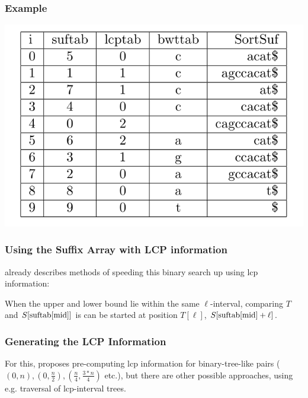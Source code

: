 \documentclass[compress,handout]{beamer} %
\begin{document}
\begin{frame}
	\frametitle{Example}
	\includegraphics[width=\textwidth, height=\textheight, keepaspectratio=true]{esa_with_bwttab_example}
\end{frame}

\begin{frame}
	\frametitle{Using the Suffix Array with LCP information}
	\citealt{manber1993suffix} already describes methods of speeding
	this binary search up using lcp information:

	When the upper and lower bound lie within
	the same $\ell$-interval, comparing $T$ and
	$S[\hbox{suftab}[\hbox{mid}]]$ is can be started at position
	$T[\ell]$, $S[\hbox{suftab}[\hbox{mid}]+\ell]$.
\end{frame}

\begin{frame}
	\frametitle{Generating the LCP Information}
	For this, \citealt{manber1993suffix} proposes pre-computing lcp
	information for binary-tree-like pairs
	($(0,n), (0,\frac{n}{2}), (\frac{n}{4}, \frac{3*n}{4})$ etc.),
	but there are other possible approaches, using e.g. traversal
	of lcp-interval trees.
\end{frame}
\end{document}
